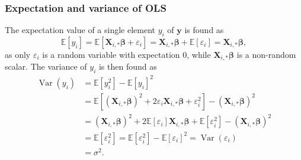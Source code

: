\documentclass{article}
\DeclareMathOperator*{\Var}{Var}
\begin{document}
\subsubsection{Expectation and variance of OLS}
The expectation value of a single element $y_i$ of $\boldsymbol{y}$ is found as
\begin{equation*}
    \mathbb{E}[y_i] = \mathbb{E}\left[ \textbf{X}_{i,*} \boldsymbol{\beta} + \varepsilon_i \right] = \textbf{X}_{i,*} \boldsymbol{\beta} + \mathbb{E}\left[ \varepsilon_i \right] = \textbf{X}_{i,*} \boldsymbol{\beta},
\end{equation*}
as only $\varepsilon_i$ is a random variable with expectation $0$, while $\textbf{X}_{i,*} \boldsymbol{\beta}$ is a non-random scalar. The variance of $y_i$ is then found as
\begin{align*}
    \Var(y_i) &= \mathbb{E}[y_i^2] - \mathbb{E}[y_i]^2 \\
    &= \mathbb{E}\left[ (\textbf{X}_{i,*}\boldsymbol{\beta})^2 + 2\varepsilon_i \textbf{X}_{i,*} \boldsymbol{\beta} + \varepsilon_i^2 \right] - (\textbf{X}_{i,*} \boldsymbol{\beta})^2 \\
    &= (\textbf{X}_{i,*} \boldsymbol{\beta})^2 + 2\mathbb{E}[\varepsilon_i] \textbf{X}_{i,*} \boldsymbol{\beta} + \mathbb{E}[\varepsilon_i^2] - (\textbf{X}_{i,*} \boldsymbol{\beta})^2 \\
    &= \mathbb{E} [\varepsilon_i^2] = \mathbb{E}[\varepsilon_i^2] - \mathbb{E}[\varepsilon_i]^2 = \Var(\varepsilon_i) \\
    &= \sigma^2.
\end{align*}
\end{document}
